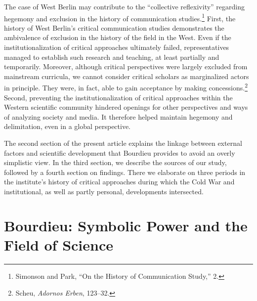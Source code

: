 \documentclass{tufte-handout}
\begin{document}
The case of West Berlin may contribute to the ``collective reflexivity''
regarding hegemony and exclusion in the history of communication
studies.\footnote{Simonson and Park, ``On the History of Communication
  Study,'' 2.} First, the history of West Berlin's critical
communication studies demonstrates the ambivalence of exclusion in the
history of the field in the West. Even if the institutionalization of
critical approaches ultimately failed, representatives managed to
establish such research and teaching, at least partially and
temporarily. Moreover, although critical perspectives were largely
excluded from mainstream curricula, we cannot consider critical scholars
as marginalized actors in principle. They were, in fact, able to gain
acceptance by making concessions.\footnote{Scheu, \emph{Adornos Erben},
  123--32.} Second, preventing the institutionalization of critical
approaches within the Western scientific community hindered openings for
other perspectives and ways of analyzing society and media. It therefore
helped maintain hegemony and delimitation, even in a global perspective.

The second section of the present article explains the linkage between
external factors and scientific development that Bourdieu provides to
avoid an overly simplistic view. In the third section, we describe the
sources of our study, followed by a fourth section on findings. There we
elaborate on three periods in the institute's history of critical
approaches during which the Cold War and institutional, as well as
partly personal, developments intersected.

\hypertarget{bourdieu-symbolic-power-and-the-field-of-science}{%
\section{Bourdieu: Symbolic Power and the Field of
Science}\label{bourdieu-symbolic-power-and-the-field-of-science}}
\end{document}
